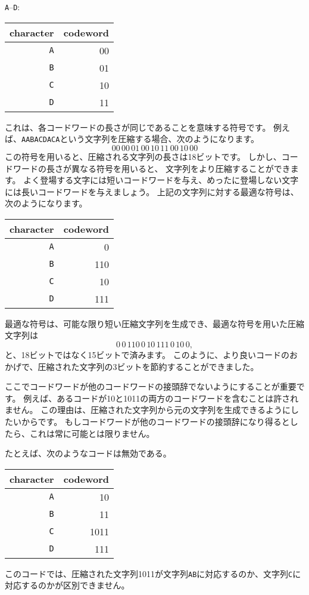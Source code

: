 \texttt{A}–\texttt{D}:
\begin{center}
\begin{tabular}{rr}
character & codeword \\
\hline
\texttt{A} & 00 \\
\texttt{B} & 01 \\
\texttt{C} & 10 \\
\texttt{D} & 11 \\
\end{tabular}
\end{center}
これは、各コードワードの長さが同じであることを意味する符号です。
例えば、\texttt{AABACDACA}という文字列を圧縮する場合、次のようになります。
\[00\,00\,01\,00\,10\,11\,00\,10\,00\]
この符号を用いると、圧縮される文字列の長さは18ビットです。
しかし、コードワードの長さが異なる符号を用いると、
文字列をより圧縮することができます。
よく登場する文字には短いコードワードを与え、めったに登場しない文字には長いコードワードを与えましょう。
上記の文字列に対する最適な符号は、次のようになります。

\begin{center}
\begin{tabular}{rr}
character & codeword \\
\hline
\texttt{A} & 0 \\
\texttt{B} & 110 \\
\texttt{C} & 10 \\
\texttt{D} & 111 \\
\end{tabular}
\end{center}
最適な符号は、可能な限り短い圧縮文字列を生成でき、最適な符号を用いた圧縮文字列は
\[0\,0\,110\,0\,10\,111\,0\,10\,0,\]
と、18ビットではなく15ビットで済みます。
このように、より良いコードのおかげで、圧縮された文字列の3ビットを節約することができました。

ここでコードワードが他のコードワードの接頭辞でないようにすることが重要です。
例えば、あるコードが10と1011の両方のコードワードを含むことは許されません。
この理由は、圧縮された文字列から元の文字列を生成できるようにしたいからです。
もしコードワードが他のコードワードの接頭辞になり得るとしたら、これは常に可能とは限りません。

たとえば、次のようなコードは無効である。

\begin{center}
\begin{tabular}{rr}
character & codeword \\
\hline
\texttt{A} & 10 \\
\texttt{B} & 11 \\
\texttt{C} & 1011 \\
\texttt{D} & 111 \\
\end{tabular}
\end{center}
このコードでは、圧縮された文字列1011が文字列\texttt{AB}に対応するのか、文字列\texttt{C}に対応するのかが区別できません。

